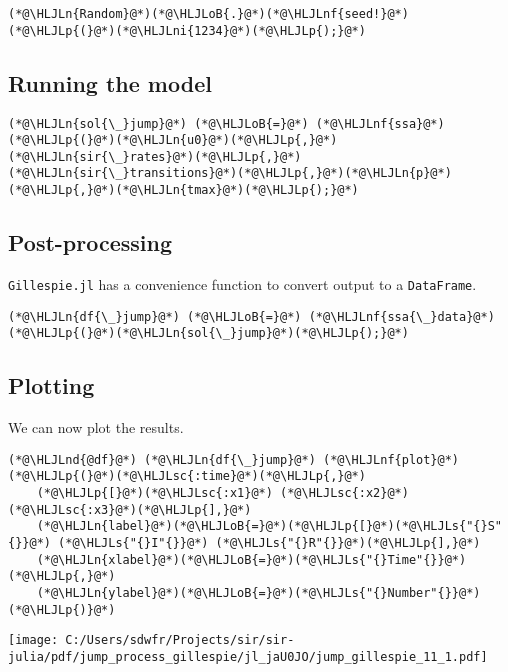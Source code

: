 \documentclass[12pt,a4paper]{article}
\newcommand{\HLJLn}[1]{#1}
\newcommand{\HLJLnd}[1]{\textcolor[RGB]{214,102,97}{#1}}
\newcommand{\HLJLnf}[1]{\textcolor[RGB]{66,102,213}{#1}}
\newcommand{\HLJLs}[1]{\textcolor[RGB]{201,61,57}{#1}}
\newcommand{\HLJLsc}[1]{\textcolor[RGB]{201,61,57}{#1}}
\newcommand{\HLJLni}[1]{\textcolor[RGB]{59,151,46}{#1}}
\newcommand{\HLJLoB}[1]{\textcolor[RGB]{102,102,102}{\textbf{#1}}}
\newcommand{\HLJLp}[1]{#1}
\begin{document}
\begin{lstlisting}
(*@\HLJLn{Random}@*)(*@\HLJLoB{.}@*)(*@\HLJLnf{seed!}@*)(*@\HLJLp{(}@*)(*@\HLJLni{1234}@*)(*@\HLJLp{);}@*)
\end{lstlisting}


\subsection{Running the model}

\begin{lstlisting}
(*@\HLJLn{sol{\_}jump}@*) (*@\HLJLoB{=}@*) (*@\HLJLnf{ssa}@*)(*@\HLJLp{(}@*)(*@\HLJLn{u0}@*)(*@\HLJLp{,}@*)(*@\HLJLn{sir{\_}rates}@*)(*@\HLJLp{,}@*)(*@\HLJLn{sir{\_}transitions}@*)(*@\HLJLp{,}@*)(*@\HLJLn{p}@*)(*@\HLJLp{,}@*)(*@\HLJLn{tmax}@*)(*@\HLJLp{);}@*)
\end{lstlisting}


\subsection{Post-processing}
\texttt{Gillespie.jl} has a convenience function to convert output to a \texttt{DataFrame}.


\begin{lstlisting}
(*@\HLJLn{df{\_}jump}@*) (*@\HLJLoB{=}@*) (*@\HLJLnf{ssa{\_}data}@*)(*@\HLJLp{(}@*)(*@\HLJLn{sol{\_}jump}@*)(*@\HLJLp{);}@*)
\end{lstlisting}


\subsection{Plotting}
We can now plot the results.


\begin{lstlisting}
(*@\HLJLnd{@df}@*) (*@\HLJLn{df{\_}jump}@*) (*@\HLJLnf{plot}@*)(*@\HLJLp{(}@*)(*@\HLJLsc{:time}@*)(*@\HLJLp{,}@*)
    (*@\HLJLp{[}@*)(*@\HLJLsc{:x1}@*) (*@\HLJLsc{:x2}@*) (*@\HLJLsc{:x3}@*)(*@\HLJLp{],}@*)
    (*@\HLJLn{label}@*)(*@\HLJLoB{=}@*)(*@\HLJLp{[}@*)(*@\HLJLs{"{}S"{}}@*) (*@\HLJLs{"{}I"{}}@*) (*@\HLJLs{"{}R"{}}@*)(*@\HLJLp{],}@*)
    (*@\HLJLn{xlabel}@*)(*@\HLJLoB{=}@*)(*@\HLJLs{"{}Time"{}}@*)(*@\HLJLp{,}@*)
    (*@\HLJLn{ylabel}@*)(*@\HLJLoB{=}@*)(*@\HLJLs{"{}Number"{}}@*)(*@\HLJLp{)}@*)
\end{lstlisting}

\texttt{[image: C:/Users/sdwfr/Projects/sir/sir-julia/pdf/jump\_process\_gillespie/jl\_jaU0JO/jump\_gillespie\_11\_1.pdf]}
\end{document}
